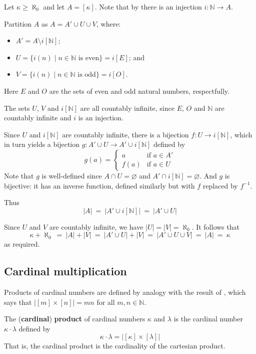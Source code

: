 \begin{cproof}
Let $\kappa \ge \aleph_0$ and let $A = [\kappa]$. Note that by  there is an injection $i : \mathbb{N} \to A$.

Partition $A$ as $A = A' \cup U \cup V$, where:
\begin{itemize}
\item $A' = A \setminus i[\mathbb{N}]$;
\item $U = \{ i(n) \mid n \in \mathbb{N} \text{ is even} \} = i[E]$; and
\item $V = \{ i(n) \mid n \in \mathbb{N} \text{ is odd} \} = i[O]$.
\end{itemize}
Here $E$ and $O$ are the sets of even and odd natural numbers, respectfully.

The sets $U$, $V$ and $i[\mathbb{N}]$ are all countably infinite, since $E$, $O$ and $\mathbb{N}$ are countably infinite and $i$ is an injection.

Since $U$ and $i[\mathbb{N}]$ are countably infinite, there is a bijection $f : U \to i[\mathbb{N}]$, which in turn yields a bijection $g : A' \cup U \to A' \cup i[\mathbb{N}]$ defined by
\[ g(a) = \begin{cases} a & \text{if } a \in A' \\ f(a) & \text{if } a \in U \end{cases} \]
Note that $g$ is well-defined since $A \cap U = \varnothing$ and $A' \cap i[\mathbb{N}] = \varnothing$. And $g$ is bijective: it has an inverse function, defined similarly but with $f$ replaced by $f^{-1}$.

Thus
\[ |A| ~=~ |A' \cup i[\mathbb{N}]| ~=~ |A' \cup U| \]

Since $U$ and $V$ are countably infinite, we have $|U| = |V| = \aleph_0$. It follows that
\[ \kappa + \aleph_0 ~=~ |A| + |V| ~=~ |A' \cup U| + |V| ~=~ |A' \cup U \cup V| ~=~ |A| ~=~ \kappa \]
as required.
\end{cproof}

\subsection*{Cardinal multiplication}

Products of cardinal numbers are defined by analogy with the result of , which says that $|[m] \times [n]| = mn$ for all $m,n \in \mathbb{N}$.

\begin{definition}
\label{defCardinalProduct}
The (\textbf{cardinal}) \textbf{product} of cardinal numbers $\kappa$ and $\lambda$ is the cardinal number $\kappa \cdot \lambda$ defined by
\[ \kappa \cdot \lambda = |[\kappa] \times [\lambda]| \]
That is, the cardinal product is the cardinality of the cartesian product.
\end{definition}


